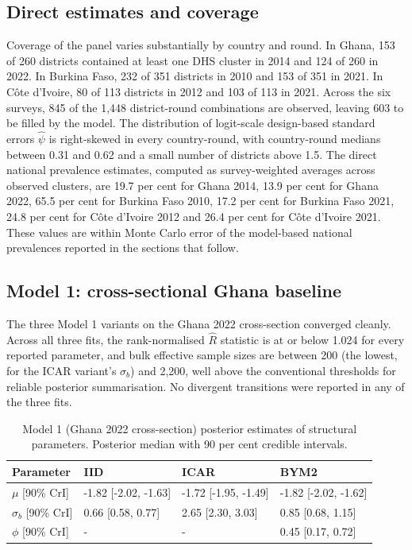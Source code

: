 \documentclass{article}
\begin{document}
\subsection{Direct estimates and
coverage}\label{direct-estimates-and-coverage}

Coverage of the panel varies substantially by country and round. In
Ghana, 153 of 260 districts contained at least one DHS cluster in 2014
and 124 of 260 in 2022. In Burkina Faso, 232 of 351 districts in 2010
and 153 of 351 in 2021. In Côte d'Ivoire, 80 of 113 districts in 2012
and 103 of 113 in 2021. Across the six surveys, 845 of the 1,448
district-round combinations are observed, leaving 603 to be filled by
the model. The distribution of logit-scale design-based standard errors
\(\widehat{\psi}\) is right-skewed in every country-round, with
country-round medians between 0.31 and 0.62 and a small number of
districts above 1.5. The direct national prevalence estimates, computed
as survey-weighted averages across observed clusters, are 19.7 per cent
for Ghana 2014, 13.9 per cent for Ghana 2022, 65.5 per cent for Burkina
Faso 2010, 17.2 per cent for Burkina Faso 2021, 24.8 per cent for Côte
d'Ivoire 2012 and 26.4 per cent for Côte d'Ivoire 2021. These values are
within Monte Carlo error of the model-based national prevalences
reported in the sections that follow.

\subsection{Model 1: cross-sectional Ghana
baseline}\label{model-1-cross-sectional-ghana-baseline-1}

The three Model 1 variants on the Ghana 2022 cross-section converged
cleanly. Across all three fits, the rank-normalised \(\hat{R}\)
statistic is at or below 1.024 for every reported parameter, and bulk
effective sample sizes are between 200 (the lowest, for the ICAR
variant's \(\sigma_b\)) and 2,200, well above the conventional
thresholds for reliable posterior summarisation. No divergent
transitions were reported in any of the three fits.

\begin{table}[!h]
\centering
\caption{\label{tab:cross-params}Model 1 (Ghana 2022 cross-section) posterior estimates of structural parameters. Posterior median with 90 per cent credible intervals. \label{tab:m1-params}}
\centering
\fontsize{8}{10}\selectfont
\begin{tabular}[t]{llll}
\toprule
Parameter & IID & ICAR & BYM2\\
\midrule
$\mu$ [90\% CrI] & -1.82 [-2.02, -1.63] & -1.72 [-1.95, -1.49] & -1.82 [-2.02, -1.62]\\
$\sigma_b$ [90\% CrI] & 0.66 [0.58, 0.77] & 2.65 [2.30, 3.03] & 0.85 [0.68, 1.15]\\
$\phi$ [90\% CrI] & - & - & 0.45 [0.17, 0.72]\\
\bottomrule
\end{tabular}
\end{table}
\end{document}
